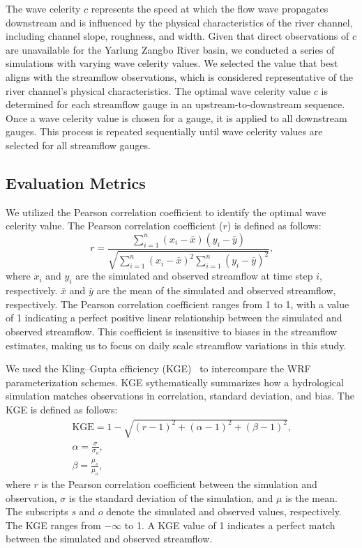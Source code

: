 \documentclass[draft]{agujournal2019}
\begin{document}
The wave celerity $c$ represents the speed at which the flow wave propagates downstream and is influenced by the physical characteristics of the river channel, including channel slope, roughness, and width. Given that direct observations of $c$ are unavailable for the Yarlung Zangbo River basin, we conducted a series of simulations with varying wave celerity values. We selected the value that best aligns with the streamflow observations, which is considered representative of the river channel's physical characteristics. The optimal wave celerity value $c$ is determined for each streamflow gauge in an upstream-to-downstream sequence. Once a wave celerity value is chosen for a gauge, it is applied to all downstream gauges. This process is repeated sequentially until wave celerity values are selected for all streamflow gauges.

\subsection{Evaluation Metrics}
\label{sec:metrics}

We utilized the Pearson correlation coefficient to identify the optimal wave celerity value. The Pearson correlation coefficient ($r$) is defined as follows:
\begin{equation}
      r = \frac{\sum_{i=1}^{n} (x_i - \bar{x})(y_i - \bar{y})}{\sqrt{\sum_{i=1}^{n} (x_i - \bar{x})^2 \sum_{i=1}^{n} (y_i - \bar{y})^2}} \textrm{,}
\end{equation}
where $x_i$ and $y_i$ are the simulated and observed streamflow at time step $i$, respectively. $\bar{x}$ and $\bar{y}$ are the mean of the simulated and observed streamflow, respectively. The Pearson correlation coefficient ranges from \textminus{}1 to 1, with a value of 1 indicating a perfect positive linear relationship between the simulated and observed streamflow. This coefficient is insensitive to biases in the streamflow estimates, making us to focus on daily scale streamflow variations in this study.

We used the Kling--Gupta efficiency (KGE)~\cite{gupta2009JH} to intercompare the WRF parameterization schemes. KGE sythematically summarizes how a hydrological simulation matches observations in correlation, standard deviation, and bias. The KGE is defined as follows:
\begin{eqnarray}
      \textrm{KGE} = 1 - \sqrt{\left(r - 1\right)^2 + \left(\alpha  - 1\right)^2 + \left(\beta - 1\right)^2} \textrm{,} \\
      \alpha  = \frac{\sigma}{\sigma_o} \textrm{,}                                                                 \\
      \beta = \frac{\mu_s}{\mu_o} \textrm{,}
\end{eqnarray}
where $r$ is the Pearson correlation coefficient between the simulation and observation, $\sigma$ is the standard deviation of the simulation, and $\mu$ is the mean. The subscripts $s$ and $o$ denote the simulated and observed values, respectively. The KGE ranges from $-\infty$ to 1. A KGE value of 1 indicates a perfect match between the simulated and observed streamflow.
\end{document}
